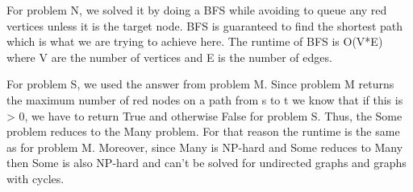 \documentclass{tufte-handout}
\begin{document}
For problem N, we solved it by doing a BFS while avoiding to queue any red vertices unless it is the target node. BFS is guaranteed
to find the shortest path which is what we are trying to achieve here.
The runtime of BFS is O(V*E) where V are the number of vertices and E is the number of edges.

For problem S, we used the answer from problem M. Since problem M returns the maximum number of red nodes on a path from s to t we know that if this is > 0, we have
to return True and otherwise False for problem S. Thus, the Some problem reduces to the Many problem.
For that reason the runtime is the same as for problem M. Moreover, since Many is NP-hard and Some reduces to Many then Some is also NP-hard and can't be solved for
undirected graphs and graphs with cycles.
\end{document}
